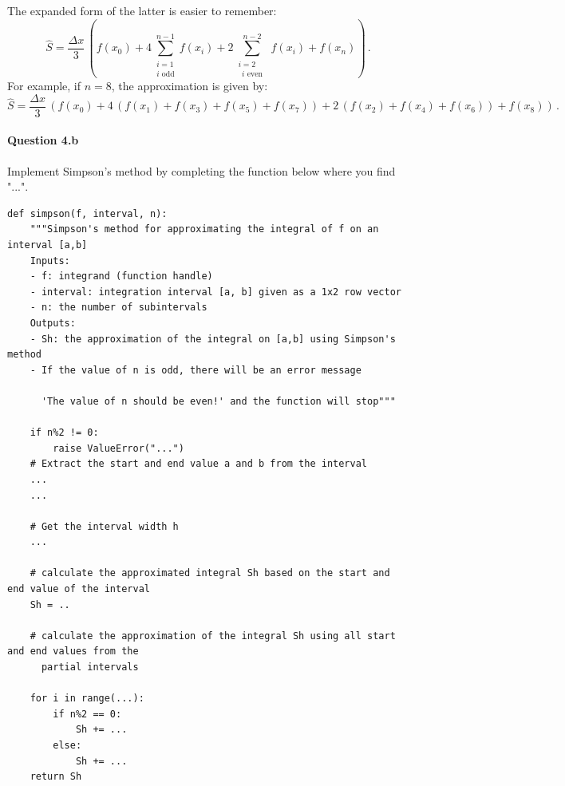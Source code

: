 The expanded form of the latter is easier to remember:
\begin{equation*}
\hat{S} = \dfrac{\Delta x}{3}\,\left( f(x_0) +   4\sum_{\substack{i=1\\i\text{ odd}}}^{n-1}{f(x_{i})} +  2\sum_{\substack{i=2\\\,\;i \text{ even}\;\,}}^{n-2}{f(x_{i})}  +  f(x_n) \right)\,.
\end{equation*}
For example, if $n=8$, the approximation is given by:
\begin{equation*}
\hat{S} = \dfrac{\Delta x}{3}\,\left(f(x_0) + 4\,\left(f(x_1) + f(x_3) + f(x_5) + f(x_7)\right) +  2\,\left(f(x_2) + f(x_4) + f(x_6)\right) + f(x_8)\right)\,.
\end{equation*}





\paragraph{Question 4.b}
Implement Simpson's method by completing the function below where you find "...".

\begin{lstlisting}
def simpson(f, interval, n):
    """Simpson's method for approximating the integral of f on an interval [a,b]
    Inputs:
    - f: integrand (function handle)
    - interval: integration interval [a, b] given as a 1x2 row vector
    - n: the number of subintervals
    Outputs:
    - Sh: the approximation of the integral on [a,b] using Simpson's method
    - If the value of n is odd, there will be an error message
    
      'The value of n should be even!' and the function will stop"""
    
    if n%2 != 0:
        raise ValueError("...")
    # Extract the start and end value a and b from the interval
    ...
    ...

    # Get the interval width h
    ...

    # calculate the approximated integral Sh based on the start and end value of the interval
    Sh = ..

    # calculate the approximation of the integral Sh using all start and end values from the 
      partial intervals

    for i in range(...):
        if n%2 == 0:
            Sh += ...
        else:
            Sh += ...
    return Sh
\end{lstlisting}


